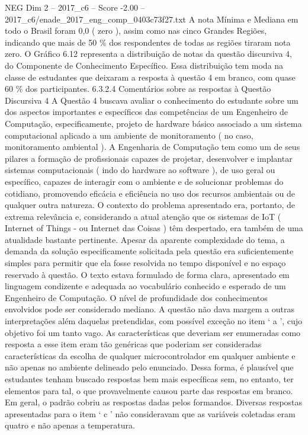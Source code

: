 \begin{textsample}{NEG Dim 2 – 2017\_c6 – Score -2.00 – 2017\_c6/enade\_2017\_eng\_comp\_0403c73f27.txt}
A nota Mínima e Mediana em todo o Brasil foram 0,0 ( zero ), assim como nas cinco Grandes Regiões, indicando que mais de 50 \% dos respondentes de todas as regiões tiraram nota zero.
O Gráfico 6.12 representa a distribuição de notas da questão discursiva 4, do Componente de Conhecimento Específico.
Essa distribuição tem moda na classe de estudantes que deixaram a resposta à questão 4 em branco, com quase 60 \% dos participantes. 6.3.2.4 Comentários sobre as respostas à Questão Discursiva 4 A Questão 4 buscava avaliar o conhecimento do estudante sobre um dos aspectos importantes e específicos das competências de um Engenheiro de Computação, especificamente, projeto de hardware básico associado a um sistema computacional aplicado a um ambiente de monitoramento ( no caso, monitoramento ambiental ).
A Engenharia de Computação tem como um de seus pilares a formação de profissionais capazes de projetar, desenvolver e implantar sistemas computacionais ( indo do hardware ao software ), de uso geral ou específico, capazes de interagir com o ambiente e de solucionar problemas do cotidiano, promovendo eficácia e eficiência no uso dos recursos ambientais ou de qualquer outra natureza.
O contexto do problema apresentado era, portanto, de extrema relevância e, considerando a atual atenção que os sistemas de IoT ( Internet of Things - ou Internet das Coisas ) têm despertado, era também de uma atualidade bastante pertinente.
Apesar da aparente complexidade do tema, a demanda da solução especificamente solicitada pela questão era suficientemente simples para permitir que ela fosse resolvida no tempo disponível e no espaço reservado à questão.
O texto estava formulado de forma clara, apresentado em linguagem condizente e adequada ao vocabulário conhecido e esperado de um Engenheiro de Computação.
O nível de profundidade dos conhecimentos envolvidos pode ser considerado mediano.
A questão não dava margem a outras interpretações além daquelas pretendidas, com possível exceção no item ‘ a ’, cujo objetivo foi um tanto vago.
As características que deveriam ser enumeradas como resposta a esse item eram tão genéricas que poderiam ser consideradas características da escolha de qualquer microcontrolador em qualquer ambiente e não apenas no ambiente delineado pelo enunciado.
Dessa forma, é plausível que estudantes tenham buscado respostas bem mais específicas sem, no entanto, ter elementos para tal, o que provavelmente causou parte das respostas em branco.
Em geral, o padrão cobriu as respostas dadas pelos formandos.
Diversas respostas apresentadas para o item ‘ c ’ não consideravam que as variáveis coletadas eram quatro e não apenas a temperatura.

\end{textsample}
